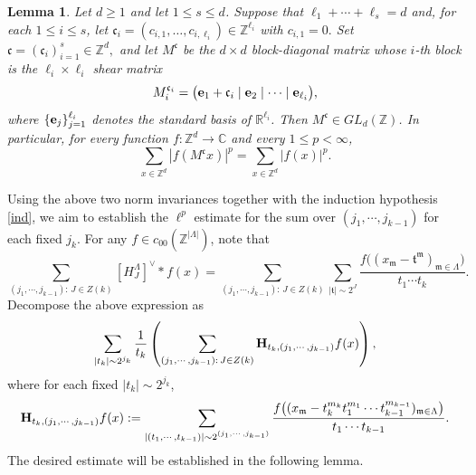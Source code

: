 \documentclass[10pt,a4paper]{amsart}
\newtheorem{lemma}{Lemma}\numberwithin{lemma}{section}
\numberwithin{equation}{section}
\begin{document}
\begin{lemma}\label{lem:shear} Let $d\ge 1$ and let $1\le s\le d$. Suppose that $ \ell_1+\cdots+\ell_s=d$ and, for each $1\le i\le s$, let $\mathfrak{c}_i = (c_{i,1},\ldots,c_{i,\ell_i}) \in\mathbb{Z}^{\ell_i}$ with $ c_{i,1}=0.$ Set  $ \mathfrak{c} = (\mathfrak{c}_i)_{i=1}^s\in\mathbb{Z}^d,$ and let $M^{\mathfrak{c}}$ be the $d\times d$ block-diagonal matrix whose $i$-th block is the $\ell_i\times\ell_i$ shear matrix \[ M_i^{\mathfrak{c}_i} = \bigl( {\bf e}_1+\mathfrak{c}_i \mid {\bf e}_2 \mid\cdots\mid {\bf e}_{\ell_i} \bigr), \] where $\{{\bf e}_j\}_{j=1}^{\ell_i}$ denotes the standard basis of $\mathbb{R}^{\ell_i}$. Then $M^{\mathfrak{c}}\in GL_d(\mathbb{Z})$. In particular, for every function $f:\mathbb{Z}^d\to\mathbb{C}$ and every $1\le p<\infty$, \[ \sum_{x\in\mathbb{Z}^d} \left|f(M^{\mathfrak{c}}x)\right|^p = \sum_{x\in\mathbb{Z}^d} |f(x)|^p. \] 
\end{lemma}



Using the above two norm invariances together with the induction hypothesis \eqref{ind}, we aim to establish the $\ell^p$ estimate for the sum over $(j_1,\cdots,j_{k-1})$ for each fixed $j_k$. For any $f\in c_{00}(\mathbb{Z}^{|\Lambda|})$, note that
\[
\sum_{(j_1,\cdots,j_{k-1}):\, J\in Z(k)}[H_J^{\Lambda}]^{\vee}*f(x)
=
\sum_{(j_1,\cdots,j_{k-1}):\, J\in Z(k)}
\sum_{|\mathfrak{t}|\sim 2^{J}}
\frac{ f\big((x_{\mathfrak{m}}-\mathfrak{t}^{\mathfrak{m}})_{\mathfrak{m}\in \Lambda} \big)}{t_1\cdots t_k}.
\]
Decompose the above expression as
\begin{align}\label{9nn}
\sum_{|t_k|\sim 2^{j_k}} \frac{1}{t_k}
\left(
\sum_{(j_1,\cdots,j_{k-1}):\, J\in Z(k)}
{\bf H}_{t_k,(j_1,\cdots,j_{k-1})}f(x)
\right),
\end{align}
where for each fixed $|t_k|\sim 2^{j_k}$,
\[
{\bf H}_{t_k,(j_1,\cdots,j_{k-1})}f(x)
:=
\sum_{|(t_1,\cdots,t_{k-1})|\sim 2^{(j_1,\cdots,j_{k-1})}}
\frac{
f\big((x_{\mathfrak{m}}-t_k^{m_k} t_1^{m_1}\cdots t_{k-1}^{m_{k-1}})_{\mathfrak{m}\in \Lambda}\big)
}{t_1\cdots t_{k-1}}.
\]
 The desired estimate will be established in the following lemma.
 
\end{document}
